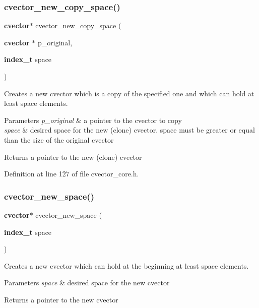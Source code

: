 \subsubsection{cvector\+\_\+new\+\_\+copy\+\_\+space()}
{\footnotesize\ttfamily \textbf{ cvector}$\ast$ cvector\+\_\+new\+\_\+copy\+\_\+space (\begin{DoxyParamCaption}\item[{\textbf{ cvector} $\ast$}]{p\+\_\+original,  }\item[{\textbf{ index\+\_\+t}}]{space }\end{DoxyParamCaption})}

Creates a new cvector which is a copy of the specified one and which can hold at least space elements. 
\begin{DoxyParams}{Parameters}
{\em p\+\_\+original} & a pointer to the cvector to copy \\
\hline
{\em space} & desired space for the new (clone) cvector. space must be greater or equal than the size of the original cvector \\
\hline
\end{DoxyParams}
\begin{DoxyReturn}{Returns}
a pointer to the new (clone) cvector 
\end{DoxyReturn}


Definition at line 127 of file cvector\+\_\+core.\+h.

\mbox{\label{cvector__interface_8h_abc0d094d5cdbd31fc74f3902fd74a690}} 
\subsubsection{cvector\+\_\+new\+\_\+space()}
{\footnotesize\ttfamily \textbf{ cvector}$\ast$ cvector\+\_\+new\+\_\+space (\begin{DoxyParamCaption}\item[{\textbf{ index\+\_\+t}}]{space }\end{DoxyParamCaption})}

Creates a new cvector which can hold at the beginning at least space elements. 
\begin{DoxyParams}{Parameters}
{\em space} & desired space for the new cvector \\
\hline
\end{DoxyParams}
\begin{DoxyReturn}{Returns}
a pointer to the new cvector 
\end{DoxyReturn}


